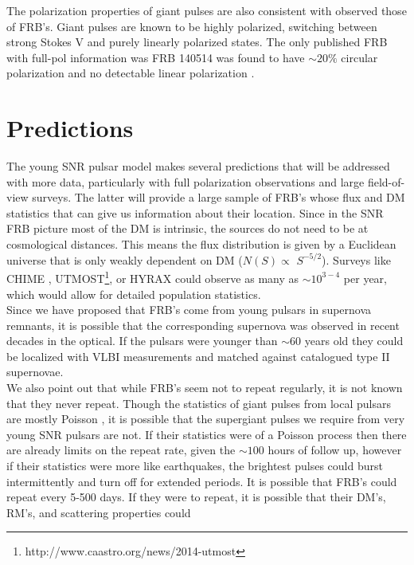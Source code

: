 \documentclass[useAMS,usenatbib]{mn2e}
\begin{document}
The polarization properties of giant pulses are also consistent with
observed those of FRB's. Giant pulses are known to be highly polarized, 
switching between strong Stokes V and purely linearly polarized states. 
The only published FRB with full-pol information was FRB 140514 was 
found to have $\sim20\%$ circular polarization and no detectable 
linear polarization \citep{2014arXiv1412.0342P}.

\section{Predictions}
\label{sec-predictions}

The young SNR pulsar model makes several predictions that will
be addressed with more data, particularly with full polarization 
observations and large field-of-view surveys. 
The latter will provide a large sample of FRB's whose flux and DM statistics
that can give us information about their location. Since in the SNR FRB picture
most of the DM is intrinsic, the sources do not need to be at cosmological 
distances. This means the flux distribution is given by a Euclidean universe
that is only weakly dependent on DM ($N(S) \propto$ $S^{-5/2}$). Surveys
like CHIME \citep{2014SPIE.9145E..22B}, 
UTMOST\footnote{http://www.caastro.org/news/2014-utmost},
 or HYRAX could observe as many as $\sim10^{3-4}$
per year, which would allow for detailed population statistics.
\\
Since we have proposed that FRB's come from young pulsars 
in supernova remnants, it is possible that the corresponding 
supernova was observed in recent decades in the optical. If the pulsars
were younger than $\sim$60 years old they could be localized with VLBI
measurements and matched against catalogued type II supernovae. 
\\
We also point out that while FRB's seem not to repeat regularly, 
it is not known that they never repeat. Though the statistics 
of giant pulses from local pulsars are mostly Poisson \citep{1999ApJ...517..460S},
it is possible that 
the supergiant pulses we require from very young SNR pulsars are not. If their 
statistics were of a Poisson process then there are already limits on the repeat rate, 
given the $\sim100$ hours of follow up, however if their statistics were more like
earthquakes, the brightest pulses could burst intermittently and turn off
for extended periods. It is possible that FRB's could repeat every 5-500 days. 
If they were to repeat,
it is possible that their DM's, RM's, and scattering properties could 
\end{document}
